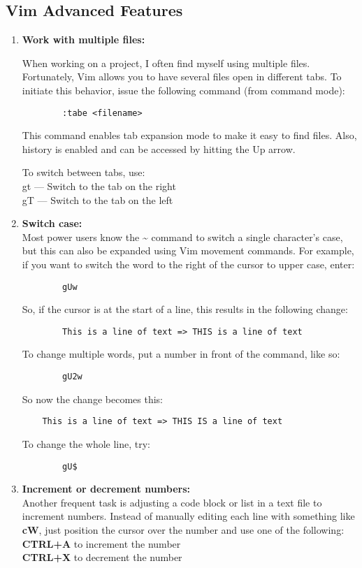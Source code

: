 \documentclass[titlepage]{article}
\begin{document}
	\subsection{Vim Advanced Features}
	\begin{enumerate}
	\item \textbf{Work with multiple files:}
	
	When working on a project, I often find myself using multiple files. Fortunately, Vim allows you to have several files open in different tabs. To initiate this behavior, issue the following command (from command mode):
	\begin{lstlisting}
		:tabe <filename>
	\end{lstlisting}
	This command enables tab expansion mode to make it easy to find files. Also, history is enabled and can be accessed by hitting the Up arrow.
	
	To switch between tabs, use:\\
	gt — Switch to the tab on the right\\
	gT — Switch to the tab on the left
	\item \textbf{Switch case:}\\Most power users know the 
	\textbf{\~} command to switch a single character's case, but this can also be expanded using Vim movement commands. For example, if you want to switch the word to the right of the cursor to upper case, enter:
	\begin{lstlisting}
		gUw
	\end{lstlisting}
	So, if the cursor is at the start of a line, this results in the following change:
	\begin{lstlisting}
		This is a line of text => THIS is a line of text
	\end{lstlisting}
	To change multiple words, put a number in front of the command, like so:
	\begin{lstlisting}
		gU2w
	\end{lstlisting}
	So now the change becomes this:
	\begin{lstlisting}
	This is a line of text => THIS IS a line of text
	\end{lstlisting}
	To change the whole line, try:
	\begin{lstlisting}
		gU$
	\end{lstlisting}
	\item \textbf{Increment or decrement numbers:}\\
	Another frequent task is adjusting a code block or list in a text file to increment numbers. Instead of manually editing each line with something like \textbf{cW}, just position the cursor over the number and use one of the following:\\
	\textbf{CTRL+A} to increment the number\\
	\textbf{CTRL+X} to decrement the number
	\end{enumerate}
\end{document}
